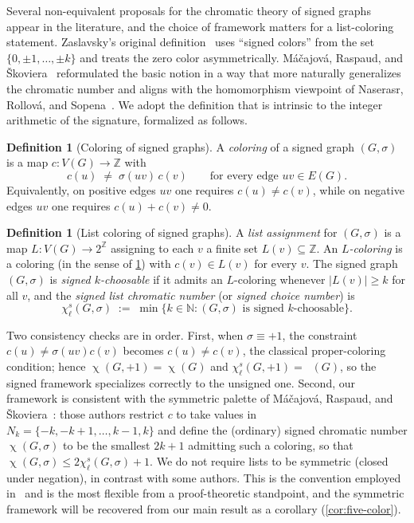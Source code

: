 \documentclass[11pt,a4paper]{article}
\theoremstyle{plain}
\theoremstyle{definition}
\newtheorem{definition}[theorem]{Definition}
\newcommand{\Z}{\mathbb{Z}}
\newcommand{\N}{\mathbb{N}}
\newcommand{\E}{E}
\newcommand{\V}{V}
\DeclareMathOperator{\chia}{\chi}
\DeclareMathOperator{\chil}{\chi_\ell}
\newcommand{\chs}{\chi_{\ell}^{s}}
\newcommand{\Gs}{(G,\sigma)}
\newcommand{\Ns}[1]{N_{#1}}
\begin{document}
Several non-equivalent proposals for the chromatic theory of signed
graphs appear in the literature, and the choice of framework matters
for a list-coloring statement. Zaslavsky's original
definition~\cite{Zaslavsky1982,Zaslavsky1982a} uses ``signed colors''
from the set $\{0,\pm1,\dots,\pm k\}$ and treats the zero color
asymmetrically. M\'a\v{c}ajov\'a, Raspaud, and
\v{S}koviera~\cite{MRS2016} reformulated the basic notion in a way
that more naturally generalizes the chromatic number and aligns
with the homomorphism viewpoint of Naserasr, Rollov\'a, and
Sopena~\cite{NaserasrRS2015}. We adopt the definition that is
intrinsic to the integer arithmetic of the signature, formalized
as follows.

\begin{definition}[Coloring of signed graphs]\label{def:color}
A \emph{coloring} of a signed graph $\Gs$ is a map $c\colon\V(G)\to\Z$
with
\[
   c(u)\;\ne\;\sigma(uv)\,c(v)\qquad\text{for every edge } uv\in\E(G).
\]
Equivalently, on positive edges $uv$ one requires $c(u)\ne c(v)$,
while on negative edges $uv$ one requires $c(u)+c(v)\ne 0$.
\end{definition}

\begin{definition}[List coloring of signed graphs]\label{def:listcolor}
A \emph{list assignment} for $\Gs$ is a map $L\colon\V(G)\to 2^{\Z}$
assigning to each $v$ a finite set $L(v)\subseteq\Z$. An
\emph{$L$-coloring} is a coloring (in the sense of
\cref{def:color}) with $c(v)\in L(v)$ for every $v$. The signed
graph $\Gs$ is \emph{signed $k$-choosable} if it admits an
$L$-coloring whenever $|L(v)|\ge k$ for all $v$, and the
\emph{signed list chromatic number} (or \emph{signed choice number})
is
\[
   \chs\Gs \;:=\; \min\bigl\{ k\in\N : \Gs\text{ is signed }k\text{-choosable}\bigr\}.
\]
\end{definition}

Two consistency checks are in order. First, when $\sigma\equiv+1$,
the constraint $c(u)\ne\sigma(uv)c(v)$ becomes $c(u)\ne c(v)$, the
classical proper-coloring condition; hence $\chia(G,+1)=\chia(G)$
and $\chs(G,+1)=\chil(G)$, so the signed framework specializes
correctly to the unsigned one. Second, our framework is consistent
with the symmetric palette of M\'a\v{c}ajov\'a, Raspaud, and
\v{S}koviera~\cite{MRS2016}: those authors restrict $c$ to take
values in $\Ns{k}=\{-k,-k+1,\dots,k-1,k\}$ and define the
(ordinary) signed chromatic number $\chia\Gs$ to be the smallest
$2k+1$ admitting such a coloring, so that $\chia\Gs\le 2\chs\Gs+1$.
We do not require lists to be symmetric (closed under negation), in
contrast with some authors. This is the convention employed
in~\cite{JinKangSteffen2016} and is the most flexible from a
proof-theoretic standpoint, and the symmetric framework will be
recovered from our main result as a corollary
(\cref{cor:five-color}).
\end{document}
